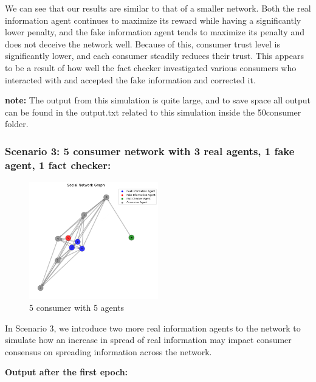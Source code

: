 \documentclass[twoside]{article}
\begin{document}
 We can see that our results are similar to that of a smaller network. Both the real information agent continues to maximize its reward while having a significantly lower penalty, and the fake information agent tends to maximize its penalty and does not deceive the network well. Because of this, consumer trust level is significantly lower, and each consumer steadily reduces their trust. This appears to be a result of how well the fact checker investigated various consumers who interacted with and accepted the fake information and corrected it.

 \textbf{note: } The output from this simulation is quite large, and to save space all output can be found in the output.txt related to this simulation inside the 50consumer folder.

 \pagebreak
 \subsubsection{Scenario 3: 5 consumer network with 3 real agents, 1 fake agent, 1 fact checker:}
 
 \begin{figure}[htbp]
     \centering
     \includegraphics[width=0.5\textwidth]{../results/multi_real_agent/initial.png}
     \caption{5 consumer with 5 agents}
     \label{fig: 5 consumer, 5 agents}
 \end{figure}

In Scenario 3, we introduce two more real information agents to the network to simulate how an increase in spread of real information may impact consumer consensus on spreading information across the network.

\textbf{Output after the first epoch: }
\end{document}
